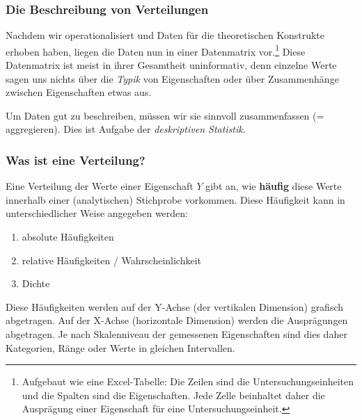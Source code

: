 \begin{frame}
\frametitle{Die Beschreibung von Verteilungen}

Nachdem wir operationalisiert und Daten für die theoretischen Konstrukte erhoben haben, liegen die Daten nun in einer Datenmatrix vor.\footnote{Aufgebaut wie eine Excel-Tabelle: Die Zeilen sind die Untersuchungseinheiten und die Spalten sind die Eigenschaften. Jede Zelle beinhaltet daher die Ausprägung einer Eigenschaft für eine Untersuchungseinheit.} Diese Datenmatrix ist meist in ihrer Gesamtheit uninformativ, denn einzelne Werte sagen uns nichts über die \textit{Typik} von Eigenschaften oder über Zusammenhänge zwischen Eigenschaften etwas aus. \vfill

Um Daten gut zu beschreiben, müssen wir sie sinnvoll zusammenfassen (= aggregieren). Dies ist Aufgabe der \textit{deskriptiven Statistik}. 


\end{frame}
\begin{frame}
\frametitle{Was ist eine Verteilung?}

Eine Verteilung der Werte einer Eigenschaft $Y$ gibt an, wie \textbf{häufig} diese Werte innerhalb einer (analytischen) Stichprobe vorkommen. Diese Häufigkeit kann in unterschiedlicher Weise angegeben werden: 

\vfill

\begin{enumerate}
  \item absolute Häufigkeiten
  \item relative Häufigkeiten / Wahrscheinlichkeit 
  \item Dichte
\end{enumerate}

\vfill

Diese Häufigkeiten werden auf der Y-Achse (der vertikalen Dimension) grafisch abgetragen. Auf der X-Achse (horizontale Dimension) werden die Ausprägungen abgetragen. Je nach Skalenniveau der gemessenen Eigenschaften sind dies daher Kategorien, Ränge oder Werte in gleichen Intervallen. 

\end{frame}
